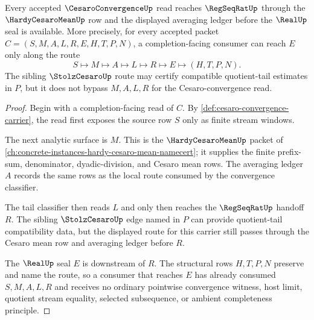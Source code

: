 \begin{theorem}\label{thm:cesaro-convergence-regseqrat-handoff}
Every accepted $\CesaroConvergenceUp$ read reaches $\RegSeqRatUp$ through the $\HardyCesaroMeanUp$ row and the displayed averaging ledger before the $\RealUp$ seal is available. More precisely, for every accepted packet $C=(S,M,A,L,R,E,H,T,P,N)$, a completion-facing consumer can reach $E$ only along the route
$$
S \longmapsto M \longmapsto A \longmapsto L \longmapsto R \longmapsto E \longmapsto (H,T,P,N).
$$
The sibling $\StolzCesaroUp$ route may certify compatible quotient-tail estimates in $P$, but it does not bypass $M,A,L,R$ for the Cesaro-convergence read.
\end{theorem}
\begin{proof}
Begin with a completion-facing read of $C$. By \autoref{def:cesaro-convergence-carrier}, the read first exposes the source row $S$ only as finite stream windows.

The next analytic surface is $M$. This is the $\HardyCesaroMeanUp$ packet of \autoref{ch:concrete-instances-hardy-cesaro-mean-namecert}; it supplies the finite prefix-sum, denominator, dyadic-division, and Cesaro mean rows. The averaging ledger $A$ records the same rows as the local route consumed by the convergence classifier.

The tail classifier then reads $L$ and only then reaches the $\RegSeqRatUp$ handoff $R$. The sibling $\StolzCesaroUp$ edge named in $P$ can provide quotient-tail compatibility data, but the displayed route for this carrier still passes through the Cesaro mean row and averaging ledger before $R$.

The $\RealUp$ seal $E$ is downstream of $R$. The structural rows $H,T,P,N$ preserve and name the route, so a consumer that reaches $E$ has already consumed $S,M,A,L,R$ and receives no ordinary pointwise convergence witness, host limit, quotient stream equality, selected subsequence, or ambient completeness principle.
\end{proof}



